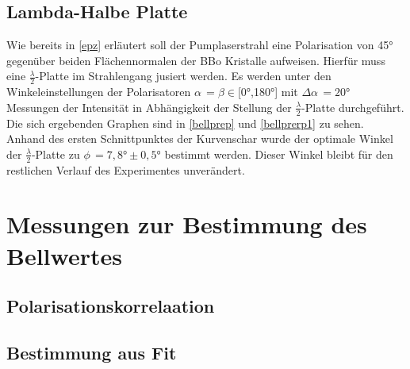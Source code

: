 \documentclass[twoside,colorback,accentcolor=tud4c,11pt]{tudreport}
\begin{document}
\subsection{Lambda-Halbe Platte}
Wie bereits in \ref{epz} erläutert soll der Pumplaserstrahl eine Polarisation von 45° gegenüber beiden Flächennormalen der BBo Kristalle aufweisen. Hierfür muss eine $\frac{\lambda}{2}$-Platte im Strahlengang jusiert werden. Es werden unter den Winkeleinstellungen der Polarisatoren $\alpha\,=\beta\in$[0°,180°] mit $\Delta\alpha\,=20°$ Messungen der Intensität in Abhängigkeit der Stellung der $\frac{\lambda}{2}$-Platte durchgeführt. Die sich ergebenden Graphen sind in \ref{bellprep} und \ref{bellprerp1} zu sehen. Anhand des ersten Schnittpunktes der Kurvenschar wurde der optimale Winkel der $\frac{\lambda}{2}$-Platte zu $\phi\,=7,8°\pm0,5°$ bestimmt werden. Dieser Winkel bleibt für den restlichen Verlauf des Experimentes unverändert.
\begin{figure}[H]
  \centering
  \quad
  \quad
  \caption{ }
  \label{resisspule}
\end{figure}
\section{Messungen zur Bestimmung des Bellwertes}
\subsection{Polarisationskorrelaation}
\subsection{Bestimmung aus Fit}
\end{document}
